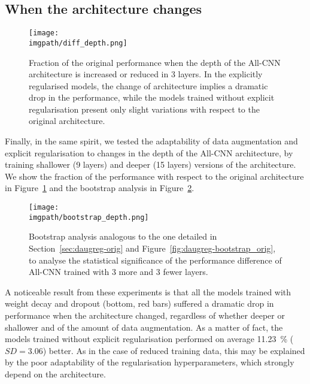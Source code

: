 {\subsection{When the architecture changes}
\label{sec:daugreg-depth}
\begin{figure}[tb]
  \begin{center}
    \texttt{[image: \\imgpath/diff\_depth.png]}
  \end{center}
  \caption{Fraction of the original performance when the depth of the All-CNN architecture is increased or reduced in 3 layers. In the explicitly regularised models, the change of architecture implies a dramatic drop in the performance, while the models trained without explicit regularisation present only slight variations with respect to the original architecture.}
  \label{fig:daugreg-depth}
\end{figure}

Finally, in the same spirit, we tested the adaptability of data augmentation and explicit regularisation to changes in the depth of the All-CNN architecture, by training shallower (9 layers) and deeper (15 layers) versions of the architecture. We show the fraction of the performance with respect to the original architecture in Figure~\ref{fig:daugreg-depth} and the bootstrap analysis in Figure~\ref{fig:daugreg-bootstrap_depth}.

\begin{figure}[ht]
  \begin{center}
    \texttt{[image: \\imgpath/bootstrap\_depth.png]}
  \end{center}
  \caption{Bootstrap analysis analogous to the one detailed in Section~\ref{sec:daugreg-orig} and Figure~\ref{fig:daugreg-bootstrap_orig}, to analyse the statistical significance of the performance difference of All-CNN trained with 3 more and 3 fewer layers.}
  \label{fig:daugreg-bootstrap_depth}
\end{figure}

A noticeable result from these experiments is that all the models trained with weight decay and dropout (bottom, red bars) suffered a dramatic drop in performance when the architecture changed, regardless of whether deeper or shallower and of the amount of data augmentation. As a matter of fact, the models trained without explicit regularisation performed on average 11.23~\% ($SD = 3.06$) better. As in the case of reduced training data, this may be explained by the poor adaptability of the regularisation hyperparameters, which strongly depend on the architecture.

}
